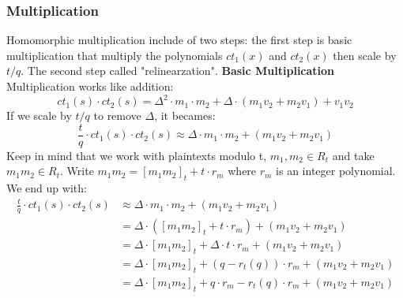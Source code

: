 \documentclass[A4paper,12pt]{article}
\begin{document}
	\subsubsection{Multiplication}
Homomorphic multiplication include of two steps: the first step is basic multiplication that multiply the polynomials $ct_1(x)$ and $ct_2(x)$ then scale by $t/q$. The second step called "relinearzation". \newline
\textbf{Basic Multiplication}
Multiplication works like addition:
\begin{equation*}
ct_1(s) \cdot ct_2(s) = \Delta^2 \cdot m_1 \cdot m_2 + \Delta \cdot ( m_1v_2 + m_2v_1) + v_1v_2
\end{equation*}
If we scale by $t/q$ to remove $\Delta$, it becames:
\begin{equation*}
\frac{t}{q} \cdot ct_1(s) \cdot ct_2(s) \approx \Delta \cdot m_1 \cdot m_2 +( m_1v_2 + m_2v_1)
\end{equation*}
Keep in mind that we work with plaintexts modulo t, $m_1, m_2 \in R_t$ and take $m_1m_2 \in R_t$. Write $m_1m_2 = [m_1m_2]_t + t \cdot r_m$ where $r_m$ is an integer polynomial.
We end up with:
\begin{equation}\label{eq:mul1}
\begin{aligned}
\frac{t}{q} \cdot ct_1(s) \cdot ct_2(s) &\approx \Delta \cdot m_1 \cdot m_2 +( m_1v_2 + m_2v_1)\\
&= \Delta \cdot ([m_1m_2]_t + t \cdot r_m) + (m_1v_2 + m_2v_1)\\
&= \Delta \cdot [m_1m_2]_t + \Delta \cdot t \cdot r_m + (m_1v_2 + m_2v_1)\\
&= \Delta \cdot [m_1m_2]_t + (q - r_t(q))\cdot r_m + (m_1v_2 + m_2v_1)\\
&= \Delta \cdot [m_1m_2]_t + q \cdot r_m - r_t(q) \cdot r_m + (m_1v_2 + m_2v_1)\\
\end{aligned}
\end{equation}
\end{document}
